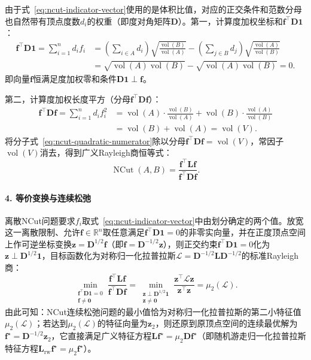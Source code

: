 由于式~\eqref{eq:ncut-indicator-vector}使用的是体积比值，对应的正交条件和范数分母也自然带有顶点度数$d_i$的权重（即度对角矩阵$\bm D$）。第一，计算度加权坐标和$\bm f^\top\bm D\bm 1$：
\[
\begin{aligned}
  \bm f^\top\bm D\bm 1
  = \sum_{i=1}^n d_i f_i
  &= \left(\sum_{i\in A}d_i\right)\sqrt{\frac{\operatorname{vol}(B)}{\operatorname{vol}(A)}}
    - \left(\sum_{j\in B}d_j\right)\sqrt{\frac{\operatorname{vol}(A)}{\operatorname{vol}(B)}} \\
  &= \sqrt{\operatorname{vol}(A)\operatorname{vol}(B)} - \sqrt{\operatorname{vol}(A)\operatorname{vol}(B)}
  = 0.
\end{aligned}
\]
即向量$\bm f$恒满足度加权零和条件$\bm D\bm 1\perp\bm f$。

第二，计算度加权长度平方（分母$\bm f^\top\bm D\bm f$）：
\[
\begin{aligned}
  \bm f^\top\bm D\bm f
  = \sum_{i=1}^n d_i f_i^2
  &= \operatorname{vol}(A)\cdot\frac{\operatorname{vol}(B)}{\operatorname{vol}(A)}
    + \operatorname{vol}(B)\cdot\frac{\operatorname{vol}(A)}{\operatorname{vol}(B)} \\
  &= \operatorname{vol}(B) + \operatorname{vol}(A)
  = \operatorname{vol}(V).
\end{aligned}
\]
将分子式~\eqref{eq:ncut-quadratic-numerator}除以分母$\bm f^\top\bm D\bm f=\operatorname{vol}(V)$，常因子$\operatorname{vol}(V)$消去，得到广义Rayleigh商恒等式：
\begin{equation}
\label{eq:ncut-rayleigh-identity}
  \operatorname{NCut}(A,B) = \frac{\bm f^\top\bm L\bm f}{\bm f^\top\bm D\bm f}.
\end{equation}

\paragraph{4. 等价变换与连续松弛}

离散NCut问题要求$f_i$取式~\eqref{eq:ncut-indicator-vector}中由划分确定的两个值。放宽这一离散限制、允许$\bm f\in\mathbb R^n$取任意满足$\bm f^\top\bm D\bm 1=0$的非零实向量，并在正度顶点空间上作可逆坐标变换$\bm z=\bm D^{1/2}\bm f$（即$\bm f=\bm D^{-1/2}\bm z$），则正交约束$\bm f^\top\bm D\bm 1=0$化为$\bm z\perp\bm D^{1/2}\bm 1$，目标函数化为对称归一化拉普拉斯$\mathcal L=\bm D^{-1/2}\bm L\bm D^{-1/2}$的标准Rayleigh商：
\begin{equation}
\label{eq:ncut-spectral-relaxation}
  \min_{\substack{\bm f^\top\bm D\bm 1=0\\\bm f\neq\bm 0}}\frac{\bm f^\top\bm L\bm f}{\bm f^\top\bm D\bm f}
  = \min_{\substack{\bm z\perp\bm D^{1/2}\bm 1\\\bm z\neq\bm 0}}\frac{\bm z^\top\mathcal L\bm z}{\bm z^\top\bm z}
  = \mu_2(\mathcal L).
\end{equation}
由此可知：NCut连续松弛问题的最小值恰为对称归一化拉普拉斯的第二小特征值$\mu_2(\mathcal L)$；若达到$\mu_2(\mathcal L)$的特征向量为$\bm z_2$，则还原到原顶点空间的连续最优解为$\bm f^\star=\bm D^{-1/2}\bm z_2$，它直接满足广义特征方程$\bm L\bm f^\star=\mu_2\bm D\bm f^\star$（即随机游走归一化拉普拉斯特征方程$\bm L_{\mathrm{rw}}\bm f^\star=\mu_2\bm f^\star$）。

